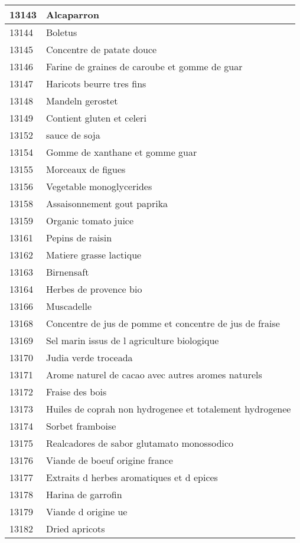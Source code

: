 \begin{longtable}{|l|l|}
13143 & Alcaparron \\ \hline 
13144 & Boletus \\ \hline 
13145 & Concentre de patate douce \\ \hline 
13146 & Farine de graines de caroube et gomme de guar \\ \hline 
13147 & Haricots beurre tres fins \\ \hline 
13148 & Mandeln gerostet \\ \hline 
13149 & Contient gluten et celeri \\ \hline 
13152 & sauce de soja \\ \hline 
13154 & Gomme de xanthane et gomme guar \\ \hline 
13155 & Morceaux de figues \\ \hline 
13156 & Vegetable monoglycerides \\ \hline 
13158 & Assaisonnement gout paprika \\ \hline 
13159 & Organic tomato juice \\ \hline 
13161 & Pepins de raisin \\ \hline 
13162 & Matiere grasse lactique \\ \hline 
13163 & Birnensaft \\ \hline 
13164 & Herbes de provence bio \\ \hline 
13166 & Muscadelle \\ \hline 
13168 & Concentre de jus de pomme et concentre de jus de fraise \\ \hline 
13169 & Sel marin issus de l agriculture biologique \\ \hline 
13170 & Judia verde troceada \\ \hline 
13171 & Arome naturel de cacao avec autres aromes naturels \\ \hline 
13172 & Fraise des bois \\ \hline 
13173 & Huiles de coprah non hydrogenee et totalement hydrogenee \\ \hline 
13174 & Sorbet framboise \\ \hline 
13175 & Realcadores de sabor glutamato monossodico \\ \hline 
13176 & Viande de boeuf origine france \\ \hline 
13177 & Extraits d herbes aromatiques et d epices \\ \hline 
13178 & Harina de garrofin \\ \hline 
13179 & Viande d origine ue \\ \hline 
13182 & Dried apricots \\ \hline 

\end{longtable}
